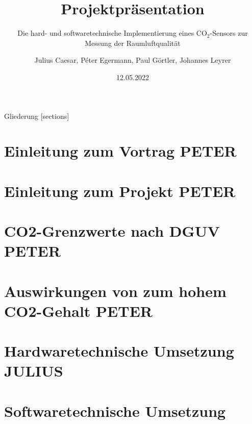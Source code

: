\documentclass[10pt,ngerman]{beamer}
\title{Projektpräsentation}
\date{12.05.2022}
\author{Julius Caesar, Péter Egermann, Paul Görtler, Johannes Leyrer}
\institute{BSZ für Elektrotechnik Dresden -- IT20/2}
\subtitle{Die hard- und softwaretechnische Implementierung eines CO$_2$-Sensors zur Messung der Raumluftqualität}
\begin{document}
\maketitle

\begin{frame}{Gliederung}
  [sections]
  \tableofcontents[hideallsubsections]
\end{frame}

\section{Einleitung zum Vortrag PETER}

\section{Einleitung zum Projekt PETER}

\section{CO2-Grenzwerte nach DGUV PETER}

\section{Auswirkungen von zum hohem CO2-Gehalt PETER}

\section{Hardwaretechnische Umsetzung JULIUS}

\section{Softwaretechnische Umsetzung}
\end{document}

